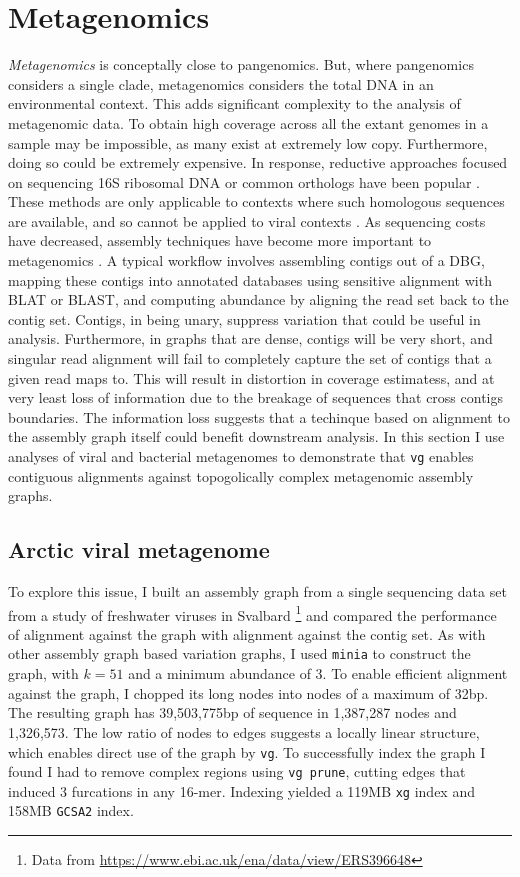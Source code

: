 \section{Metagenomics}

\emph{Metagenomics} is conceptally close to pangenomics.
But, where pangenomics considers a single clade, metagenomics considers the total DNA in an environmental context.
This adds significant complexity to the analysis of metagenomic data.
To obtain high coverage across all the extant genomes in a sample may be impossible, as many exist at extremely low copy.
Furthermore, doing so could be extremely expensive.
In response, reductive approaches focused on sequencing 16S ribosomal DNA or common orthologs have been popular \cite{tringe2005comparative}.
These methods are only applicable to contexts where such homologous sequences are available, and so cannot be applied to viral contexts \cite{edwards2005viral}.
As sequencing costs have decreased, assembly techniques have become more important to metagenomics \cite{nurk2017metaspades}.
A typical workflow involves assembling contigs out of a DBG, mapping these contigs into annotated databases using sensitive alignment with BLAT or BLAST, and computing abundance by aligning the read set back to the contig set.
Contigs, in being unary, suppress variation that could be useful in analysis.
Furthermore, in graphs that are dense, contigs will be very short, and singular read alignment will fail to completely capture the set of contigs that a given read maps to.
This will result in distortion in coverage estimatess, and at very least loss of information due to the breakage of sequences that cross contigs boundaries.
The information loss suggests that a techinque based on alignment to the assembly graph itself could benefit downstream analysis.
In this section I use analyses of viral and bacterial metagenomes to demonstrate that {\tt vg} enables contiguous alignments against topogolically complex metagenomic assembly graphs.

\subsection{Arctic viral metagenome}

To explore this issue, I built an assembly graph from a single sequencing data set from a study of freshwater viruses in Svalbard \cite{de2015biodiversity}\footnote{Data from \url{https://www.ebi.ac.uk/ena/data/view/ERS396648}} and compared the performance of alignment against the graph with alignment against the contig set.
As with other assembly graph based variation graphs, I used {\tt minia} to construct the graph, with $k=51$ and a minimum abundance of 3.
To enable efficient alignment against the graph, I chopped its long nodes into nodes of a maximum of 32bp.
The resulting graph has 39,503,775bp of sequence in 1,387,287 nodes and 1,326,573.
The low ratio of nodes to edges suggests a locally linear structure, which enables direct use of the graph by {\tt vg}.
To successfully index the graph I found I had to remove complex regions using {\tt vg prune}, cutting edges that induced 3 furcations in any 16-mer.
Indexing yielded a 119MB {\tt xg} index and 158MB {\tt GCSA2} index.


